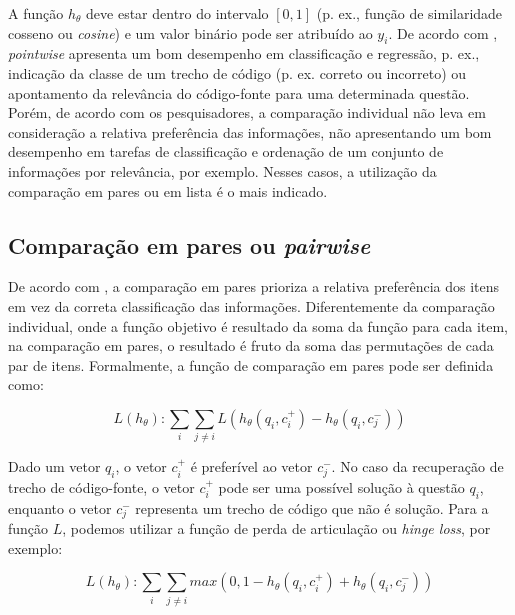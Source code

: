 A função $h_{\theta}$ deve estar dentro do intervalo $[0, 1]$ (p. ex., função de similaridade cosseno ou \textit{cosine}) e um valor binário pode ser atribuído ao $y_{i}$. De acordo com \cite{guo-deep-look-into-neural-ranking-models:2019, wu-sql-rank-listwise-approach:2018},  \textit{pointwise} apresenta um bom desempenho em classificação e regressão, p. ex., indicação da classe de um trecho de código (p. ex. correto ou incorreto) ou apontamento da relevância do código-fonte para uma determinada questão. Porém, de acordo com os pesquisadores, a comparação individual não leva em consideração a relativa preferência das informações, não apresentando um bom desempenho em tarefas de classificação e ordenação de um conjunto de informações por relevância, por exemplo. Nesses casos, a utilização da comparação em pares ou em lista é o mais indicado.


\subsection{Comparação em pares ou \textit{pairwise}}
\label{sec:secao-comparacao-em-pares-pairwise}

De acordo com \cite{guo-deep-look-into-neural-ranking-models:2019}, a comparação em pares prioriza a relativa preferência dos itens em vez da correta classificação das informações. Diferentemente da comparação individual, onde a função objetivo é resultado da soma da função para cada item, na comparação em pares, o resultado é fruto da soma das permutações de cada par de itens. Formalmente, a função de comparação em pares pode ser definida como:

\begin{equation}
    L (h_{\theta}): \sum_{i} \sum_{j \neq i} L( h_{\theta}(q_{i}, c_{i}^{+}) - h_{\theta}(q_{i}, c_{j}^{-})) 
\end{equation}

 Dado um vetor $q_{i}$, o vetor $c_{i}^{+}$ é preferível ao vetor $c_{j}^{-}$. No caso da recuperação de trecho de código-fonte, o vetor $c_{i}^{+}$ pode ser uma possível solução à questão $q_{i}$, enquanto o vetor $c_{j}^{-}$ representa um trecho de código que não é solução. Para a função $L$, podemos utilizar a função de perda de articulação ou \textit{hinge loss}, por exemplo:

\begin{equation}
    L (h_{\theta}): \sum_{i} \sum_{j \neq i} max(0, 1 - h_{\theta}(q_{i}, c_{i}^{+}) + h_{\theta}(q_{i}, c_{j}^{-})) 
\end{equation}


